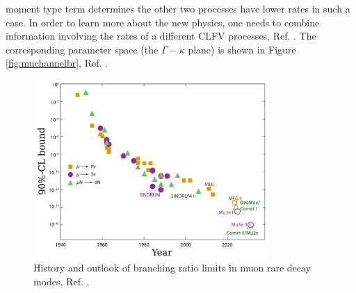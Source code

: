 moment type term determines the other two processes have lower rates in such a case. In order to learn more about the new
physics, one needs to combine information involving the rates of a different CLFV processes, Ref. \cite{osti_1042577}.
The corresponding parameter space (the $\Gamma-\kappa$ plane) is shown in Figure \ref{fig:muchannelbr}, Ref. \cite{doi:10.1146/annurev-nucl-100809-131949}.
\begin{figure}[!h]
\centering
\includegraphics[width =0.8\textwidth]{figures/png/Screenshot_20240307_161549.png}
\caption{History and outlook of branching ratio limits in muon rare decay modes, Ref. \cite{MARCIANO1977303}.}
\label{fig:muchannel}
\end{figure}
